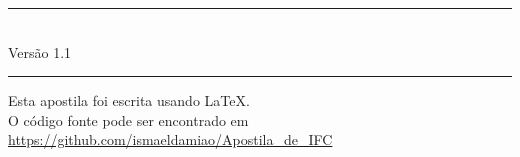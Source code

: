 \newpage
\hrule
\begin{center}
   \huge
   \imprimirtitulo \\
   \normalsize
   \imprimirautor
   \hfill
   Versão 1.1
\end{center}
\hrule
\vfill
\begin{center}
Esta apostila foi escrita usando \LaTeX.\\
O código fonte pode ser encontrado em\\
\url{https://github.com/ismaeldamiao/Apostila_de_IFC}
\end{center}
\newpage
